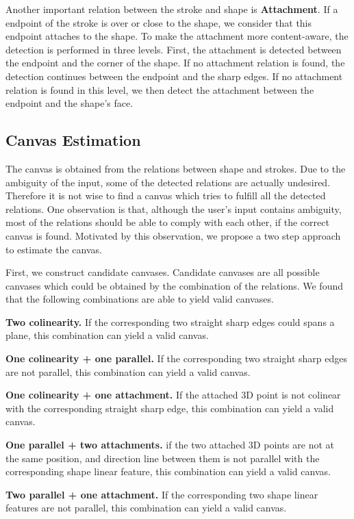 Another important relation between the stroke and shape is \textbf{Attachment}. If a endpoint of the stroke is over or close to the shape, we consider that this endpoint attaches to the shape. To make the attachment more content-aware, the detection is performed in three levels. First, the attachment is detected between the endpoint and the corner of the shape. If no attachment relation is found, the detection continues between the endpoint and the sharp edges. If no attachment relation is found in this level, we then detect the attachment between the endpoint and the shape's face.


\subsection{Canvas Estimation}

The canvas is obtained from the relations between shape and strokes. Due to the ambiguity of the input, some of the detected relations are actually undesired. Therefore it is not wise to find a canvas which tries to fulfill all the detected relations. One observation is that, although the user's input contains ambiguity, most of the relations should be able to comply with each other, if the correct canvas is found. Motivated by this observation, we propose a two step approach to estimate the canvas.

First, we construct candidate canvases. Candidate canvases are all possible canvases which could be obtained by the combination of the relations. We found that the following combinations are able to yield valid canvases.

\textbf{Two colinearity.} If the corresponding two straight sharp edges could spans a plane, this combination can yield a valid canvas.

\textbf{One colinearity + one parallel.} If the corresponding two straight sharp edges are not parallel, this combination can yield a valid canvas.

\textbf{One colinearity + one attachment.} If the attached 3D point is not colinear with the corresponding straight sharp edge, this combination can yield a valid canvas.

\textbf{One parallel + two attachments.} if the two attached 3D points are not at the same position, and direction line between them is not parallel with the corresponding shape linear feature, this combination can yield a valid canvas.

\textbf{Two parallel + one attachment.} If the corresponding two shape linear features are not parallel, this combination can yield a valid canvas.

